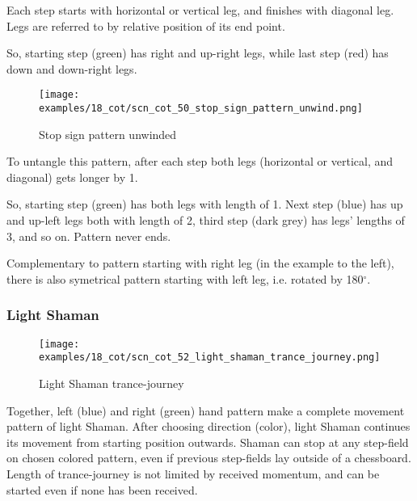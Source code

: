Each step starts with horizontal or vertical leg, and finishes with diagonal
leg. Legs are referred to by relative position of its end point.

So, starting step (green) has right and up-right legs, while last step (red)
has down and down-right legs.

\clearpage %

\noindent
\begin{wrapfigure}{l}{0.4\textwidth} %
\centering
\texttt{[image: examples/18\_cot/scn\_cot\_50\_stop\_sign\_pattern\_unwind.png]}
\caption{Stop sign pattern unwinded}
\label{fig:scn_cot_50_stop_sign_pattern_unwind}
\end{wrapfigure}
To untangle this pattern, after each step both legs (horizontal or vertical,
and diagonal) gets longer by 1.

So, starting step (green) has both legs with length of 1. Next step (blue)
has up and up-left legs both with length of 2, third step (dark grey) has
legs' lengths of 3, and so on. Pattern never ends.

Complementary to pattern starting with right leg (in the example to the
left), there is also symetrical pattern starting with left leg, i.e.
rotated by 180$^{\circ}$. %

\clearpage %

\subsubsection*{Light Shaman}
\label{sec:Conquest of Tlalocan/Trance-journey/Movement/Light Shaman}

\vspace*{-1.4\baselineskip}
\noindent
\begin{figure}[!h]
\texttt{[image: examples/18\_cot/scn\_cot\_52\_light\_shaman\_trance\_journey.png]}
\vspace*{-1.3\baselineskip}
\caption{Light Shaman trance-journey}
\label{fig:scn_cot_52_light_shaman_trance_journey}
\end{figure}

\vspace*{-0.5\baselineskip}
Together, left (blue) and right (green) hand pattern make a complete movement
pattern of light Shaman. After choosing direction (color), light Shaman
continues its movement from starting position outwards. Shaman can stop at
any step-field on chosen colored pattern, even if previous step-fields lay
outside of a chessboard. Length of trance-journey is not limited by received
momentum, and can be started even if none has been received.

